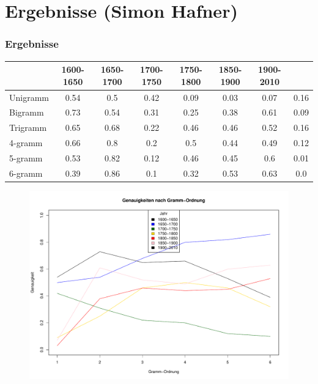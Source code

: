 \documentclass[t]{beamer} %
\begin{document}
\section{Ergebnisse (Simon Hafner)}
\begin{frame}
 \frametitle{Ergebnisse}
 \tiny
  \begin{tabular}{l|ccccccc}
    & 1600-1650 & 1650-1700 & 1700-1750 & 1750-1800 & 1850-1900 &
    1900-2010 \\
    \hline
    Unigramm & 0.54 & 0.5 & 0.42 & 0.09 & 0.03 & 0.07 & 0.16 \\
    Bigramm & 0.73 & 0.54 & 0.31 & 0.25 & 0.38 & 0.61 & 0.09 \\
    Trigramm & 0.65 & 0.68 & 0.22 & 0.46 & 0.46 & 0.52 & 0.16 \\
    4-gramm & 0.66 & 0.8 & 0.2 & 0.5 & 0.44 & 0.49 & 0.12 \\
    5-gramm & 0.53 & 0.82 & 0.12 & 0.46 & 0.45 & 0.6 & 0.01 \\
    6-gramm & 0.39 & 0.86 & 0.1 & 0.32 & 0.53 & 0.63 & 0.0 \\
  \end{tabular}
\end{frame}

\begin{frame}
  \begin{figure}[ht]
    \includegraphics[width=1\textwidth]{Jahr}
  \end{figure}
\end{frame}
\end{document}
